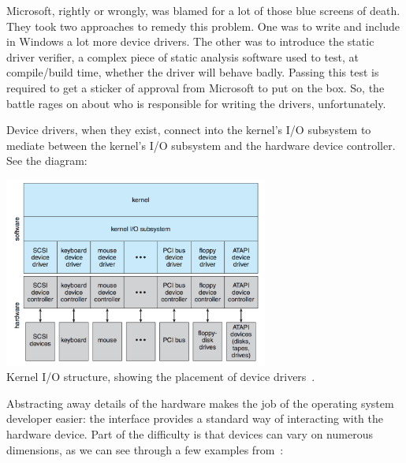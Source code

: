 Microsoft, rightly or wrongly, was blamed for a lot of those blue screens of death. They took two approaches to remedy this problem. One was to write and include in Windows a lot more device drivers. The other was to introduce the static driver verifier, a complex piece of static analysis software used to test, at compile/build time, whether the driver will behave badly. Passing this test is required to get a sticker of approval from Microsoft to put on the box. So, the battle rages on about who is responsible for writing the drivers, unfortunately.

Device drivers, when they exist, connect into the kernel's I/O subsystem to mediate between the kernel's I/O subsystem and the hardware device controller. See the diagram:

\begin{center}
	\includegraphics[width=0.65\textwidth]{images/kernel-io-structure.png}\\
	Kernel I/O structure, showing the placement of device drivers~\cite{osc}.
\end{center}

Abstracting away details of the hardware makes the job of the operating system developer easier: the interface provides a standard way of interacting with the hardware device. Part of the difficulty is that devices can vary on numerous dimensions, as we can see through a few examples from~\cite{osc}:

